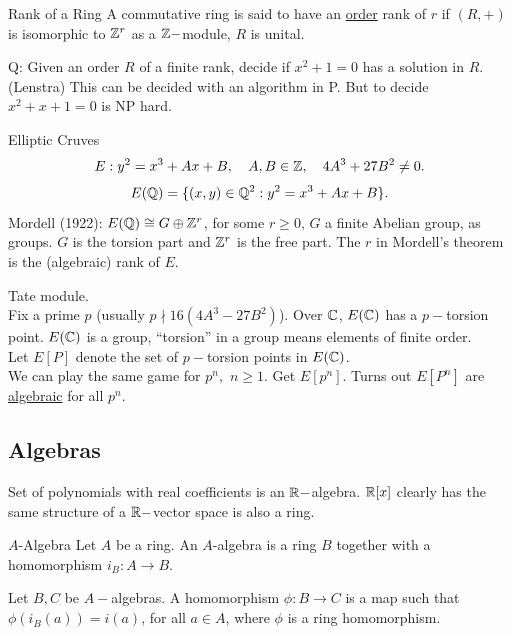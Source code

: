 \documentclass[twoside, openright, fontsize=10pt, headings=big]{scrbook}
\newcommand{\addunumberedsubsec}[1]{%
    \subsection*{#1}%
    \addcontentsline{toc}{subsection}{#1}%
}
\begin{document}
\begin{definition}{Rank of a Ring}{}
    A commutative ring is said to have an \underline{order} rank of $r$ if $(R,+)$ is isomorphic to $\mathbb{Z}^r$ as a $\mathbb{Z}-$module, $R$ is unital.
\end{definition}
Q: Given an order $R$ of a finite rank, decide if $x^2+1=0$ has a solution in $R$.\\
(Lenstra) This can be decided with an algorithm in P. But to decide $x^2+x+1=0$ is NP hard. 
\begin{example}{}{}
    Elliptic Cruves
    \[
        E:y^2=x^3+Ax+B,\quad A,B\in\mathbb{Z},\quad 4A^3+27B^2\neq0.
    \]
    \[
        E(\mathbb{Q})=\{(x,y)\in\mathbb{Q}^2:y^2=x^3+Ax+B\}.
    \]
    Mordell (1922): $E(\mathbb{Q})\cong G\oplus\mathbb{Z}^r$, for some $r\geq0$, $G$ a finite Abelian group, as groups. $G$ is the torsion part and $\mathbb{Z}^r$ is the free part. The $r$ in Mordell's theorem is the (algebraic) rank of $E$. 
\end{example}
Tate module.\\
Fix a prime $p$ (usually $p\nmid16(4A^3-27B^2)$). Over $\mathbb{C}$, $E(\mathbb{C})$ has a $p-$torsion point. $E(\mathbb{C})$ is a group, ``torsion'' in a group means elements of finite order.\\
Let $E[P]$ denote the set of $p-$torsion points in $E(\mathbb{C})$.\\
We can play the same game for $p^n,$ $n\geq1$. Get $E[p^n]$. Turns out $E[P^n]$ are \underline{algebraic} for all $p^n$.
\addunumberedsubsec{Algebras}
\begin{example}{}{}
    Set of polynomials with real coefficients is an $\mathbb{R}-$algebra. $\mathbb{R}[x]$ clearly has the same structure of a $\mathbb{R}-$vector space is also a ring. 
\end{example}
\begin{definition}{$A$-Algebra}{}
    Let $A$ be a ring. An $A$-algebra is a ring $B$ together with a homomorphism $i_B:A\to B$.
\end{definition}
\begin{definition}{}
    Let $B,C$ be $A-$algebras. A homomorphism $\phi:B\to C$ is a map such that $\phi(i_B(a))=i(a)$, for all $a\in A$, where $\phi$ is a ring homomorphism.
\end{definition}
\end{document}
